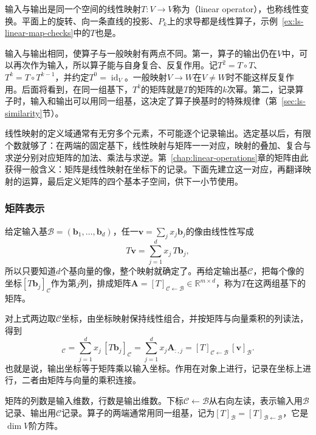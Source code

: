 \label{sec:ls-operator-powers}
输入与输出是同一个空间的线性映射$T:V\to V$称为（linear operator），也称线性变换。平面上的旋转、向一条直线的投影、$P_k$上的求导都是线性算子，示例~\ref{ex:ls-linear-map-checks}中的$T$也是。

输入与输出相同，使算子与一般映射有两点不同。第一，算子的输出仍在$V$中，可以再次作为输入，所以算子能与自身复合、反复作用。记$T^2=T\circ T$、$T^k=T\circ T^{k-1}$，并约定$T^0=\operatorname{id}_V$。一般映射$V\to W$在$V\neq W$时不能这样反复作用。后面将看到，在同一组基下，$T^k$的矩阵就是$T$的矩阵的$k$次幂。第二，记录算子时，输入和输出可以用同一组基，这决定了算子换基时的特殊规律（第~\ref{sec:ls-similarity}节）。

\label{sec:ls-map-representation}
线性映射的定义域通常有无穷多个元素，不可能逐个记录输出。选定基以后，有限个数就够了：在两端的固定基下，线性映射与矩阵一一对应，映射的叠加、复合与求逆分别对应矩阵的加法、乘法与求逆。第~\ref{chap:linear-operations}章的矩阵由此获得一般含义：矩阵是线性映射在坐标下的记录。下面先建立这一对应，再翻译映射的运算，最后定义矩阵的四个基本子空间，供下一小节使用。

\subsubsection{矩阵表示}

给定输入基$\mathcal B=(\bm b_1,\ldots,\bm b_d)$，任一$\bm v=\sum_jx_j\bm b_j$的像由线性性写成
\[
 T\bm v=\sum_{j=1}^d x_j\,T\bm b_j,
\]
所以只要知道$d$个基向量的像，整个映射就确定了。再给定输出基$\mathcal C$，把每个像的坐标$[T\bm b_j]_{\mathcal C}$作为第$j$列，排成矩阵$\bm A=[T]_{\mathcal C\leftarrow\mathcal B}\in\mathbb R^{m\times d}$，称为$T$在这两组基下的矩阵。

对上式两边取$\mathcal C$坐标，由坐标映射保持线性组合，并按矩阵与向量乘积的列读法，得到
\begin{equation}
 [T\bm v]_{\mathcal C}
 =\sum_{j=1}^d x_j\,[T\bm b_j]_{\mathcal C}
 =\sum_{j=1}^d x_j\bm A_{:,j}
 =[T]_{\mathcal C\leftarrow\mathcal B}\,[\bm v]_{\mathcal B}.
 \label{eq:linear-algebra-map-matrix-representation}
\end{equation}
也就是说，输出坐标等于矩阵乘以输入坐标。作用在对象上进行，记录在坐标上进行，二者由矩阵与向量的乘积连接。

矩阵的列数是输入维数，行数是输出维数。下标$\mathcal C\leftarrow\mathcal B$从右向左读，表示输入用$\mathcal B$记录、输出用$\mathcal C$记录。算子的两端通常用同一组基，记为$[T]_{\mathcal B}=[T]_{\mathcal B\leftarrow\mathcal B}$，它是$\dim V$阶方阵。

